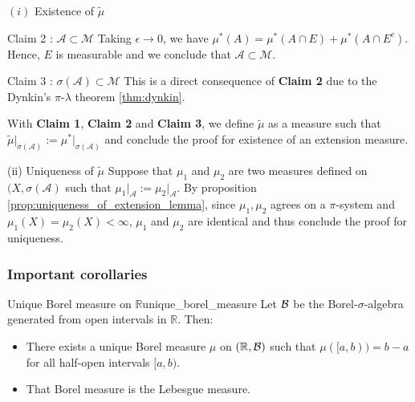 \begin{proof*}
\begin{subproof}{$(i)$ Existence of $\tilde\mu$}
\begin{subproof}{\newline Claim 2 : $\mathcal{A} \subset \mathcal{M}$}
           \noindent Taking $\epsilon\to 0$, we have $\mu^*(A) = \mu^*(A\cap E) + \mu^*(A\cap E^c)$. Hence, $E$ is measurable and we conclude that $\mathcal{A}\subset\mathcal{M}$.
        \end{subproof}

        \begin{subproof}{\newline Claim 3 : $\sigma(\mathcal{A}) \subset \mathcal{M}$}
            \newline This is a direct consequence of \textbf{Claim 2} due to the Dynkin's $\pi$-$\lambda$ theorem \ref{thm:dynkin}.
        \end{subproof}

        \noindent\newline With \textbf{Claim 1}, \textbf{Claim 2} and \textbf{Claim 3}, we define $\tilde\mu$ as a measure such that $\tilde\mu\Big|_{\sigma(\mathcal{A})}:=\mu^*\Big|_{\sigma(\mathcal{A})}$ and conclude the proof for existence of an extension measure.
    \end{subproof}

    \begin{subproof}{\newline (ii) Uniqueness of $\tilde\mu$}
        Suppose that $\mu_1$ and $\mu_2$ are two measures defined on $(X, \sigma(\mathcal{A})$ such that $\mu_1\Big|_{\mathcal{A}} := \mu_2\Big|_{\mathcal{A}}$. By proposition \ref{prop:uniqueness_of_extension_lemma}, since $\mu_1, \mu_2$ agrees on a $\pi$-system and $\mu_1(X)=\mu_2(X)<\infty$, $\mu_1$ and $\mu_2$ are identical and thus conclude the proof for uniqueness.
    \end{subproof}
\end{proof*}

\subsubsection{Important corollaries}
\begin{corollary}{Unique Borel measure on $\mathbb{R}$}{unique_borel_measure}
    Let $\borel$ be the Borel-$\sigma$-algebra generated from open intervals in $\mathbb{R}$. Then:
    \begin{itemize}
        \item There exists a unique Borel measure $\mu$ on $(\mathbb{R}, \borel)$ such that $\mu([a, b)) = b-a$ for all half-open intervals $[a, b)$.
        \item That Borel measure is the Lebesgue measure.
    \end{itemize}
\end{corollary}

